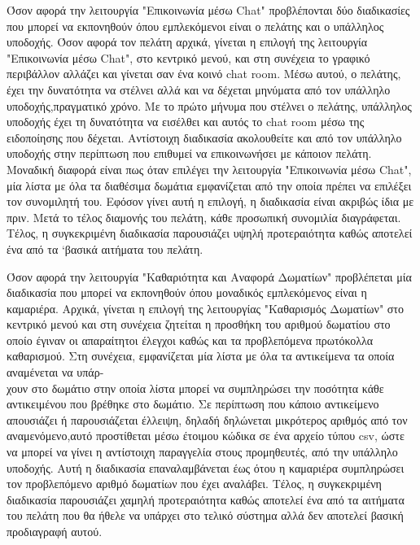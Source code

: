 \noindent
Όσον αφορά την λειτουργία "Επικοινωνία μέσω Chat" προβλέπονται δύο διαδικασίες που μπορεί να 
εκπονηθούν όπου εμπλεκόμενοι είναι ο πελάτης και ο υπάλληλος υποδοχής. Όσον αφορά τον πελάτη
αρχικά, γίνεται η επιλογή της λειτουργία "Επικοινωνία μέσω Chat", στο κεντρικό μενού, και στη 
συνέχεια το γραφικό περιβάλλον αλλάζει και γίνεται σαν ένα κοινό chat room.  Μέσω αυτού, ο 
πελάτης, έχει την δυνατότητα να στέλνει αλλά και να δέχεται μηνύματα από τον υπάλληλο 
υποδοχής,πραγματικό χρόνο. Με το πρώτο μήνυμα που στέλνει ο πελάτης, υπάλληλος υποδοχής 
έχει τη δυνατότητα να εισέλθει και αυτός το chat room μέσω της ειδοποίησης που δέχεται.  
Αντίστοιχη διαδικασία ακολουθείτε και από τον υπάλληλο υποδοχής στην περίπτωση που 
επιθυμεί να επικοινωνήσει με κάποιον πελάτη. Μοναδική διαφορά είναι πως όταν επιλέγει την 
λειτουργία "Επικοινωνία μέσω Chat", μία λίστα με όλα τα διαθέσιμα δωμάτια εμφανίζεται από την
οποία πρέπει να επιλέξει τον συνομιλητή του. Εφόσον γίνει αυτή η επιλογή, η διαδικασία είναι 
ακριβώς ίδια με πριν.  Μετά το τέλος διαμονής του πελάτη, κάθε προσωπική συνομιλία διαγράφεται.
Τέλος, η συγκεκριμένη διαδικασία παρουσιάζει υψηλή προτεραιότητα καθώς αποτελεί ένα από τα 
`βασικά αιτήματα του πελάτη.
\clearpage

\noindent
Όσον αφορά την λειτουργία "Καθαριότητα και Αναφορά Δωματίων" προβλέπεται μία διαδικασία
που μπορεί να εκπονηθούν όπου μοναδικός εμπλεκόμενος είναι η καμαριέρα. Αρχικά, γίνεται η 
επιλογή της λειτουργίας "Καθαρισμός Δωματίων" στο κεντρικό  μενού και στη συνέχεια ζητείται 
η προσθήκη του αριθμού δωματίου στο οποίο έγιναν οι απαραίτητοι έλεγχοι καθώς και τα 
προβλεπόμενα πρωτόκολλα καθαρισμού. Στη συνέχεια, εμφανίζεται μία λίστα με όλα τα αντικείμενα
τα οποία αναμένεται να υπάρ-\\χουν στο δωμάτιο στην οποία λίστα μπορεί να συμπληρώσει 
την ποσότητα κάθε αντικειμένου που βρέθηκε στο δωμάτιο. Σε περίπτωση που κάποιο 
αντικείμενο απουσιάζει ή παρουσιάζεται έλλειψη, δηλαδή δηλώνεται μικρότερος αριθμός από 
τον αναμενόμενο,αυτό προστίθεται μέσω έτοιμου κώδικα σε ένα αρχείο τύπου csv, ώστε να 
μπορεί να γίνει η αντίστοιχη παραγγελία στους προμηθευτές, από την υπάλληλο υποδοχής.
Αυτή η διαδικασία επαναλαμβάνεται έως ότου η καμαριέρα συμπληρώσει τον προβλεπόμενο 
αριθμό δωματίων που έχει αναλάβει. Τέλος, η συγκεκριμένη διαδικασία παρουσιάζει χαμηλή 
προτεραιότητα καθώς αποτελεί ένα από τα αιτήματα του πελάτη που θα ήθελε να υπάρχει στο 
τελικό σύστημα αλλά δεν αποτελεί βασική προδιαγραφή αυτού. \\



